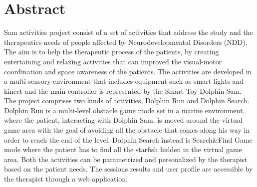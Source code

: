 \chapter{Abstract}
Sam activities project consist of a set of activities that address the study and the therapeutics needs of people affected by Neurodevelopmental Disorders (NDD).
The aim is to help the therapeutic process of the patients, by creating entertaining and relaxing activities that can improved the visual-motor coordination and space awareness of the patients. 
The activities are developed in a multi-sensory environment that includes equipment such as smart lights and kinect and the main controller is represented by the Smart Toy Dolphin Sam. \newline
The project comprises two kinds of activities, Dolphin Run and Dolphin Search. Dolphin Run is a multi-level obstacle game mode set in a marine environment, where the patient, interacting with Dolphin Sam, is moved around the virtual game area with the goal of avoiding all the obstacle that comes along his way in order to reach the end of the level. Dolphin Search instead is Search\&Find Game mode where the patient has to find all the starfish hidden in the virtual game area.
Both the activities can be parametrized and personalized by the therapist based on the patient needs. The sessions results and user profile are accessible by the therapist through a web application.
